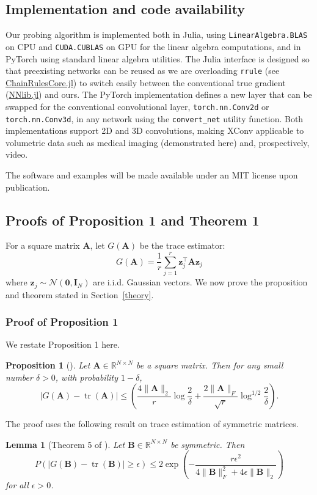 \documentclass[10pt]{article}
\newcommand{\B}{\mathbf}
\newtheorem{proposition}{Proposition}
\newtheorem{lemma}[theorem]{Lemma}
\begin{document}
\subsection{Implementation and code
availability}\label{implementation-and-code-availability}


Our probing algorithm is implemented both in Julia, using \texttt{LinearAlgebra.BLAS} on CPU and \texttt{CUDA.CUBLAS} on GPU for the linear algebra computations, and in PyTorch using standard linear algebra utilities. The Julia interface is designed so that preexisting networks can be reused as we are overloading \texttt{rrule} (see \href{https://github.com/JuliaDiff/ChainRulesCore.jl}{ChainRulesCore.jl})
to switch easily between the conventional true gradient (\href{https://github.com/FluxML/NNlib.jl}{NNlib.jl}) and ours. The PyTorch implementation defines a new layer that can be swapped for the conventional convolutional layer, \texttt{torch.nn.Conv2d} or \texttt{torch.nn.Conv3d}, in any network using the \texttt{convert\_net} utility function. Both implementations support 2D and 3D convolutions, making XConv applicable to volumetric data such as medical imaging (demonstrated here) and, prospectively, video.

The software and examples will be made available under an MIT license upon publication.

\subsection{Proofs of Proposition 1 and Theorem 1 }\label{trace-estimation-theory}

For a square matrix $\B{A}$, let $G(\B{A})$ be the trace estimator:
\[
G(\B{A}) = \frac{1}{r}\sum_{j=1}^r \B{z}_j^{\top} \B{A} \B{z}_j
\]
where $\B{z}_j\sim \mathcal{N}(\B{0},\B{I}_N)$ are i.i.d. Gaussian vectors. We now prove the proposition and theorem stated in Section~\ref{theory}.

\subsubsection{Proof of Proposition 1}
We restate Proposition 1 here.
\begin{proposition}[]\label{pro:A}Let $\B{A} \in \mathbb{R}^{N \times N}$ be a square matrix. Then for any small number $\delta >0$, with probability $1-\delta$,
\[
| G(\B{A}) - \operatorname{tr}(\B{A})| \leq \left( \frac{4\|\B{A}\|_2}{r} \log \frac{2}{\delta}+ \frac{2\|\B{A}\|_F}{\sqrt r}\log^{1/2} \frac{2}{\delta}\right).
\]
\end{proposition}
The proof uses the following result on trace estimation of symmetric matrices.
\begin{lemma}[Theorem 5 of \citep{cortinovis2020randomized}]\label{lm:sym} Let $\B{B} \in \mathbb{R}^{N \times N}$ be symmetric. Then
\[ P(| G(\B{B}) -\operatorname{tr}(\B{B})| \geq \epsilon) \leq 2\exp\left(-\frac{r\epsilon^2}{4\|\B{B}\|_F^2+4\epsilon \|\B{B}\|_2}\right)\]
for all $ \epsilon > 0$.
\end{lemma}
\end{document}
